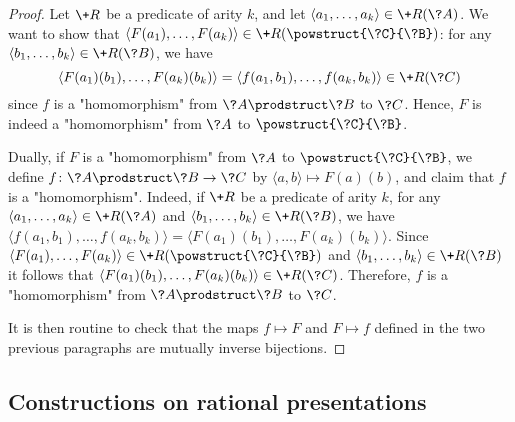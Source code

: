 \begin{proof}
Let $\+R$ be a predicate of arity $k$, and let
$\langle a_1,\hdots,a_k \rangle \in \+R(\?A)$.
We want to show that $\langle F(a_1),\hdots,F(a_k) \rangle \in \+R(\powstruct{\?C}{\?B})$:
for any $\langle b_1,\hdots,b_k \rangle \in \+R(\?B)$, we have
\[\langle F(a_1)(b_1), \hdots, F(a_k)(b_k)\rangle = \langle f(a_1,b_1),\hdots,f(a_k,b_k) \rangle \in \+R(\?C)\] since $f$ is a "homomorphism" from $\?A\prodstruct \?B$ to $\?C$.
Hence, $F$ is indeed a "homomorphism" from $\?A$ to $\powstruct{\?C}{\?B}$.

Dually, if $F$ is a "homomorphism" from $\?A$ to $\powstruct{\?C}{\?B}$,
we define $f\colon \?A\prodstruct \?B \to \?C$ by $\langle a,b \rangle \mapsto F(a)(b)$,
and claim that $f$ is a "homomorphism". Indeed, if $\+R$ be a predicate of arity $k$,
for any $\langle a_1, \hdots, a_k \rangle \in \+R(\?A)$
and $\langle b_1, \hdots, b_k \rangle \in \+R(\?B)$,
we have $\langle f(a_1,b_1), \hdots, f(a_k,b_k) \rangle
= \langle F(a_1)(b_1), \hdots, F(a_k)(b_k) \rangle$.
Since $\langle F(a_1), \hdots, F(a_k) \rangle \in \+R(\powstruct{\?C}{\?B})$
and $\langle b_1, \hdots,b_k \rangle \in \+R(\?B)$ 
it follows that $\langle F(a_1)(b_1), \hdots, F(a_k)(b_k) \rangle \in \+R(\?C)$.
Therefore, $f$ is a "homomorphism" from $\?A \prodstruct \?B$ to $\?C$.

It is then routine to check that the maps $f \mapsto F$ and $F \mapsto f$ defined
in the two previous paragraphs are mutually inverse bijections.
\end{proof}

\subsection{Constructions on rational presentations}
\label{sec:construction-automatic-presentations}

